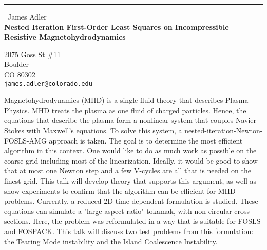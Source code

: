 \documentclass{report}
\begin{document}
\begin{center}
\rule{6in}{1pt} \
{\large James Adler \\
{\bf Nested Iteration First-Order Least Squares on Incompressible Resistive Magnetohydrodynamics}}

2075 Goss St \#11 \\ Boulder \\ CO 80302
\\
{\tt james.adler@colorado.edu}\end{center}

Magnetohydrodynamics (MHD) is a single-fluid theory that describes Plasma
Physics. MHD treats the plasma as one fluid
of charged particles. Hence, the equations that describe the plasma form
a nonlinear system that couples Navier-Stokes
with Maxwell's equations. To solve this system, a
nested-iteration-Newton-FOSLS-AMG approach is taken. The goal is to
determine the most efficient algorithm in this context. One would like to
do as much work as
possible on the coarse grid including most of the linearization. Ideally,
it would be good to show that at most one
Newton step and a few V-cycles are all that is needed on the finest grid.
This talk will develop theory that supports
this argument, as well as show experiments to confirm that the algorithm
can be efficient for MHD problems. Currently, a reduced 2D time-dependent
formulation is studied. These equations can simulate
a "large aspect-ratio" tokamak, with non-circular cross-sections. Here,
the problem was reformulated in a way that is
suitable for FOSLS and FOSPACK. This talk will discuss two test problems
from this formulation: the Tearing Mode instability and the Island
Coalescence Instability.
\end{document}
